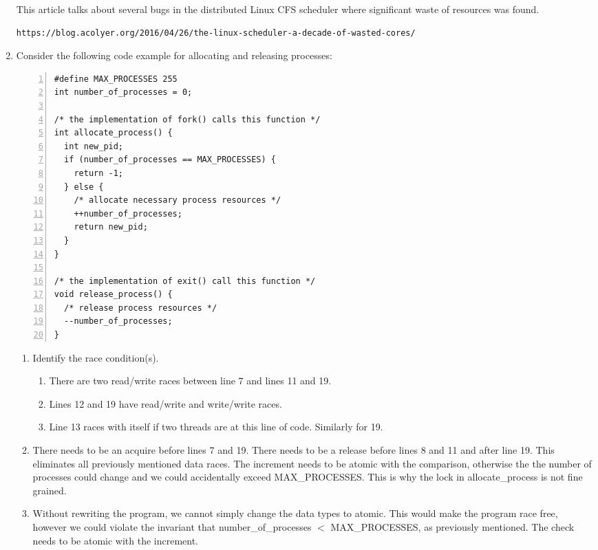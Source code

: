 \documentclass[a4paper, 11pt]{exam}
\begin{document}
\begin{enumerate}
This article talks about several bugs in the distributed Linux CFS scheduler
where significant waste of resources was found.
\begin{verbatim}https://blog.acolyer.org/2016/04/26/the-linux-scheduler-a-decade-of-wasted-cores/\end{verbatim}


\item Consider the following code example for allocating and releasing processes:

\begin{lstlisting}[numbers=left]
#define MAX_PROCESSES 255
int number_of_processes = 0;

/* the implementation of fork() calls this function */
int allocate_process() {
  int new_pid;
  if (number_of_processes == MAX_PROCESSES) {
    return -1;
  } else {
    /* allocate necessary process resources */
    ++number_of_processes;
    return new_pid;
  }
}

/* the implementation of exit() call this function */
void release_process() {
  /* release process resources */
  --number_of_processes;
}
\end{lstlisting}

\begin{enumerate}
\item Identify the race condition(s).
\begin{enumerate}
\item There are two read/write races between line 7 and lines 11 and 19.
\item Lines 12 and 19 have read/write and write/write races.
\item Line 13 races with itself if two threads are at this line of
  code. Similarly for 19.
\end{enumerate}
\item There needs to be an acquire before lines 7 and 19. There needs to be a
release before lines 8 and 11 and after line 19. This eliminates
all previously mentioned data races. 
The increment needs to be atomic with the comparison, otherwise the the number
of processes could change and we could accidentally exceed MAX\_PROCESSES. This
is why the lock in allocate\_process is not fine grained.

\item Without rewriting the program, we cannot simply change the data
  types to atomic. This would make the program race free, however we
  could violate the invariant that number\_of\_processes $<$
  MAX\_PROCESSES, as previously mentioned. The check needs to be
  atomic with the increment.
\end{enumerate}


\end{enumerate}
\end{document}
